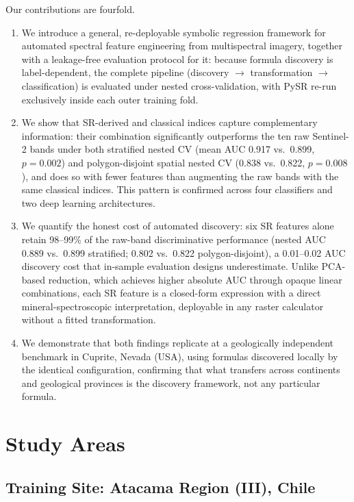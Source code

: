 \documentclass[preprint,authoryear,number]{elsarticle}
\begin{document}
Our contributions are fourfold.
\begin{enumerate}
  \item We introduce a general, re-deployable symbolic regression framework for automated spectral feature engineering from multispectral imagery, together with a leakage-free evaluation protocol for it: because formula discovery is label-dependent, the complete pipeline (discovery $\rightarrow$ transformation $\rightarrow$ classification) is evaluated under nested cross-validation, with PySR re-run exclusively inside each outer training fold.
  \item We show that SR-derived and classical indices capture complementary information: their combination significantly outperforms the ten raw Sentinel-2 bands under both stratified nested CV (mean AUC 0.917 vs.\ 0.899, $p = 0.002$) and polygon-disjoint spatial nested CV (0.838 vs.\ 0.822, $p = 0.008$), and does so with fewer features than augmenting the raw bands with the same classical indices. This pattern is confirmed across four classifiers and two deep learning architectures.
  \item We quantify the honest cost of automated discovery: six SR features alone retain 98--99\% of the raw-band discriminative performance (nested AUC 0.889 vs.\ 0.899 stratified; 0.802 vs.\ 0.822 polygon-disjoint), a 0.01--0.02 AUC discovery cost that in-sample evaluation designs underestimate. Unlike PCA-based reduction, which achieves higher absolute AUC through opaque linear combinations, each SR feature is a closed-form expression with a direct mineral-spectroscopic interpretation, deployable in any raster calculator without a fitted transformation.
  \item We demonstrate that both findings replicate at a geologically independent benchmark in Cuprite, Nevada (USA), using formulas discovered locally by the identical configuration, confirming that what transfers across continents and geological provinces is the discovery framework, not any particular formula.
\end{enumerate}


\section{Study Areas}
\label{sec:study_areas}

\subsection{Training Site: Atacama Region (III), Chile}
\end{document}
